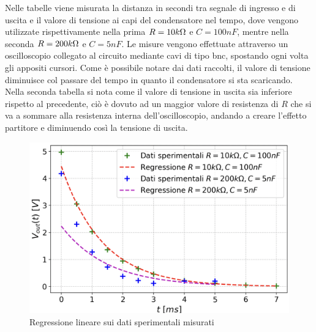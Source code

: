 Nelle tabelle viene misurata la distanza in secondi tra segnale di ingresso e di uscita e il valore di tensione ai capi del condensatore nel tempo, dove vengono utilizzate rispettivamente nella prima $R = 10 k\ohm$ e $C = 100 nF$, mentre nella seconda $R = 200 k\ohm$ e $C = 5 nF$. Le misure vengono effettuate attraverso un oscilloscopio collegato al circuito mediante cavi di tipo bnc, spostando ogni volta gli appositi cursori. 
Come è possibile notare dai dati raccolti, il valore di tensione diminuisce col passare del tempo in quanto il condensatore si sta scaricando. Nella seconda tabella si nota come il valore di tensione in uscita sia inferiore rispetto al precedente, ciò è dovuto ad un maggior valore di resistenza di $R$ che si va a sommare alla resistenza interna dell’oscilloscopio, andando a creare l’effetto partitore e diminuendo così la tensione di uscita.

\begin{figure}[ht]
    \centering
    \includegraphics[width=0.5\linewidth]{es1.png}
    \caption{Regressione lineare sui dati sperimentali misurati}
    \label{fig:enter-label}
\end{figure}

